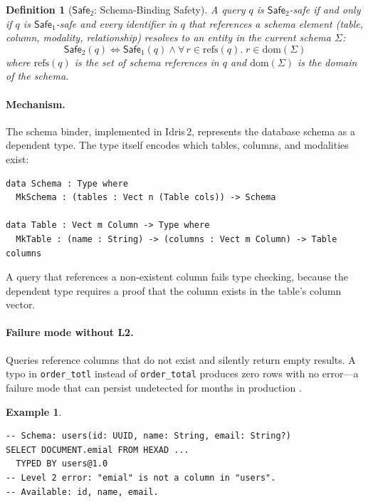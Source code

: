 \documentclass[11pt,a4paper]{article}
\newtheorem{definition}[theorem]{Definition}
\newtheorem{example}[theorem]{Example}
\newcommand{\LevelN}[1]{\textsf{L#1}}
\newcommand{\Safe}[1]{\ensuremath{\mathsf{Safe}_{#1}}}
\begin{document}
\begin{definition}[\Safe{2}: Schema-Binding Safety]
A query $q$ is \Safe{2}-safe if and only if $q$ is \Safe{1}-safe and
every identifier in $q$ that references a schema element (table,
column, modality, relationship) resolves to an entity in the current
schema $\Sigma$:
\[
  \Safe{2}(q) \iff \Safe{1}(q) \land \forall\, r \in \mathrm{refs}(q).\; r \in \mathrm{dom}(\Sigma)
\]
where $\mathrm{refs}(q)$ is the set of schema references in $q$ and
$\mathrm{dom}(\Sigma)$ is the domain of the schema.
\end{definition}

\paragraph{Mechanism.}
The schema binder, implemented in Idris\,2, represents the database
schema as a dependent type.  The type itself encodes which tables,
columns, and modalities exist:

\begin{lstlisting}[language=Idris2]
data Schema : Type where
  MkSchema : (tables : Vect n (Table cols)) -> Schema

data Table : Vect m Column -> Type where
  MkTable : (name : String) -> (columns : Vect m Column) -> Table columns
\end{lstlisting}

A query that references a non-existent column fails type checking,
because the dependent type requires a proof that the column exists
in the table's column vector.

\paragraph{Failure mode without \LevelN{2}.}
Queries reference columns that do not exist and silently return empty
results.  A typo in \texttt{order\_totl} instead of
\texttt{order\_total} produces zero rows with no error---a failure
mode that can persist undetected for months in production
\citep{kim2013silent}.

\begin{example}
\begin{lstlisting}[language=VQL]
-- Schema: users(id: UUID, name: String, email: String?)
SELECT DOCUMENT.emial FROM HEXAD ...
  TYPED BY users@1.0
-- Level 2 error: "emial" is not a column in "users".
-- Available: id, name, email.
\end{lstlisting}
\end{example}
\end{document}
